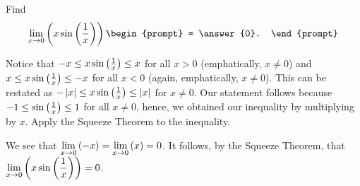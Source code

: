 \documentclass{ximera}
\author{Gregory Hartman \and Matthew Carr}
\begin{document}
\begin{exercise}



Find 
\[
\lim_{x\to0}\p{x\sin\p{\frac{1}{x}}}
\begin{prompt}
= \answer{0}.
\end{prompt}
\]

\begin{hint}
Notice that $-x\le x\sin\left(\frac{1}{x}\right)\le{x}$ for all $x>0$ (emphatically, $x\ne0$) and $x\le x\sin\left(\frac{1}{x}\right)\le{-x}$ for all $x<0$ (again, emphatically, $x\ne0$). This can be restated as $-\left|x\right|\le x\sin\left(\frac{1}{x}\right)\le\left|x\right|$ for $x\ne0$. Our statement follows because $-1\le\sin\left(\frac{1}{x}\right)\le1$ for all $x\ne0$, hence, we obtained our inequality by multiplying by $x$. Apply the Squeeze Theorem to the inequality.
\end{hint}
\begin{hint}
We see that $\lim_{x\to0}\p{-x}=\lim_{x\to0}\p{x}=0$. It follows, by the Squeeze Theorem, that $\lim_{x\to0}\p{x\sin\p{\frac{1}{x}}}=0$.
\end{hint}
\end{exercise}
\end{document}
